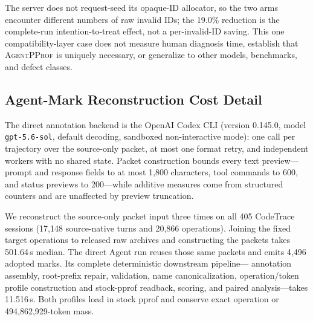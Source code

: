 \documentclass[letterpaper]{article}
\newcommand{\sys}{\textsc{AgentPProf}\xspace}
\begin{document}
The server does not request-seed its opaque-ID allocator, so the two arms
encounter different numbers of raw invalid IDs; the 19.0\% reduction is the
complete-run intention-to-treat effect, not a per-invalid-ID saving. This one
compatibility-layer case does not measure human diagnosis time, establish that
\sys is uniquely necessary, or generalize to other models, benchmarks, and
defect classes.

\subsection{Agent-Mark Reconstruction Cost Detail}
\label{app:agent-mark-reconstruction}

The direct annotation backend is the OpenAI Codex CLI (version 0.145.0,
model \texttt{gpt-5.6-sol}, default decoding, sandboxed non-interactive
mode): one call per trajectory over the source-only packet, at most one
format retry, and independent workers with no shared state.
Packet construction bounds every text preview---prompt and response fields
to at most 1{,}800 characters, tool commands to 600, and status previews to
200---while additive measures come from structured counters and are
unaffected by preview truncation.

We reconstruct the source-only packet input three times on all 405 CodeTrace
sessions (17{,}148 source-native turns and 20{,}866 operations). Joining the
fixed target operations to released raw archives and constructing the packets
takes 501.64\,s median. The direct Agent run reuses those same packets and
emits 4{,}496 adopted marks. Its complete deterministic downstream pipeline---
annotation assembly, root-prefix repair, validation, name canonicalization,
operation/token profile construction and stock-pprof readback, scoring, and
paired analysis---takes 11.516\,s. Both profiles load in stock pprof and
conserve exact operation or 494{,}862{,}929-token mass.
\end{document}
